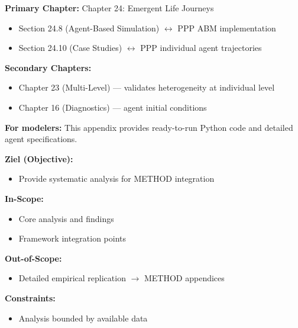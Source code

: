 \begin{tcolorbox}[colback=purple!5!white, colframe=purple!75!black, title=Chapter Linkage]

\textbf{Primary Chapter:} Chapter 24: Emergent Life Journeys
\begin{itemize}[nosep]
\item Section 24.8 (Agent-Based Simulation) $\leftrightarrow$ PPP ABM implementation
\item Section 24.10 (Case Studies) $\leftrightarrow$ PPP individual agent trajectories
\end{itemize}

\textbf{Secondary Chapters:}
\begin{itemize}[nosep]
\item Chapter 23 (Multi-Level) --- validates heterogeneity at individual level
\item Chapter 16 (Diagnostics) --- agent initial conditions
\end{itemize}

\textbf{For modelers:} This appendix provides ready-to-run Python code and detailed agent specifications.

\end{tcolorbox}


\begin{tcolorbox}[
    colback=orange!5!white,
    colframe=orange!75!black,
    title={\textbf{Appendix Scope: Ziel / In-Scope / Out-of-Scope / Constraints}},
    fonttitle=\bfseries
]

\textbf{Ziel (Objective):}
\begin{itemize}[nosep]
    \item Provide systematic analysis for METHOD integration
\end{itemize}

\textbf{In-Scope:}
\begin{itemize}[nosep]
    \item Core analysis and findings
    \item Framework integration points
\end{itemize}

\textbf{Out-of-Scope:}
\begin{itemize}[nosep]
    \item Detailed empirical replication $\rightarrow$ METHOD appendices
\end{itemize}

\textbf{Constraints:}
\begin{itemize}[nosep]
    \item Analysis bounded by available data
\end{itemize}

\end{tcolorbox}

